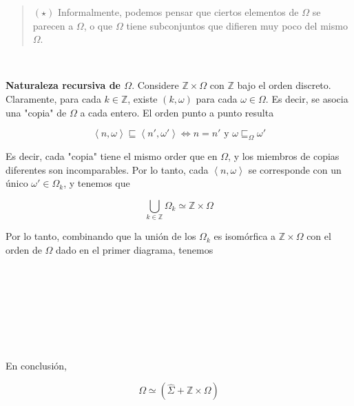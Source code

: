 \documentclass[a4paper, 12pt]{article}
\begin{document}
\begin{quote}
$(\star)$ Informalmente, podemos pensar que ciertos elementos de $\Omega$ se parecen a
$\Omega$, o que $\Omega$ tiene subconjuntos que difieren muy poco del mismo
$\Omega$.
\end{quote}
~ 

\textbf{Naturaleza recursiva de $\Omega$}. Considere $\mathbb{Z} \times \Omega$ con $\mathbb{Z}$ bajo el orden discreto.
Claramente, para cada $k \in \mathbb{Z}$, existe $(k, \omega)$ para cada $\omega
\in \Omega$. Es decir, se asocia una "copia" de $\Omega$ a cada entero. El orden
punto a punto resulta 

\begin{equation*}
  \left<n, \omega \right> \sqsubseteq \left<n', \omega' \right> 
\iff n = n' \text{ y } \omega
  \sqsubseteq_\Omega \omega'
\end{equation*}

Es decir, cada "copia" tiene el mismo order que en $\Omega$, y los miembros de
copias diferentes son incomparables. Por lo tanto, cada $\left<n,
\omega\right>$ se corresponde con un único $\omega' \in \Omega_k$, y tenemos que 

\begin{equation*}
  \bigcup_{k \in \mathbb{Z}} \Omega_k \simeq \mathbb{Z} \times \Omega
\end{equation*}

Por lo tanto, combinando que la unión de los $\Omega_k$ es isomórfica a $\mathbb{Z} \times
\Omega$ con el orden de $\Omega$ dado en el primer diagrama, tenemos

\begin{figure}
\centering
{}
\end{figure} 

~

~ 

~ 


~ 

En conclusión,

\begin{equation*}
  \Omega \simeq \left( \hat{\Sigma} + \mathbb{Z} \times \Omega \right) 
\end{equation*}
\end{document}
